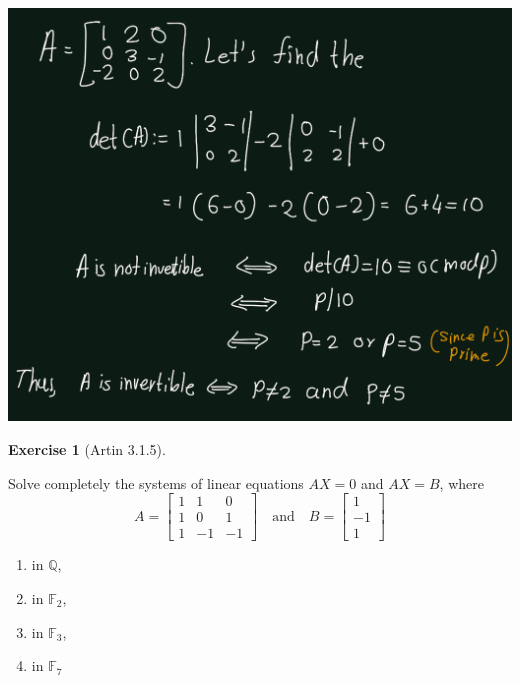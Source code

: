 \documentclass[
]{book}
\providecommand{\tightlist}{%
  \setlength{\itemsep}{0pt}\setlength{\parskip}{0pt}}
\theoremstyle{definition}
\theoremstyle{definition}
\theoremstyle{definition}
\newtheorem{exercise}{Exercise}[chapter]
\theoremstyle{definition}
\theoremstyle{remark}
\begin{document}
\includegraphics{figures/ch_3/ex-1.5.png}

\begin{exercise}[Artin 3.1.5]
\protect\hypertarget{exr:unnamed-chunk-263}{}\label{exr:unnamed-chunk-263}

Solve completely the systems of linear equations \(AX = 0\) and \(AX = B\), where
\[
A = \begin{bmatrix} 1 & 1 & 0 \\ 1 & 0 & 1 \\ 1 & -1 & -1 \end{bmatrix} \quad \text{and} \quad B = \begin{bmatrix} 1 \\ -1 \\ 1 \end{bmatrix}
\]

\begin{enumerate}
\def\labelenumi{(\alph{enumi})}
\tightlist
\item
  in \(\mathbb{Q}\),
\item
  in \(\mathbb{F}_2\),
\item
  in \(\mathbb{F}_3\),
\item
  in \(\mathbb{F}_7\)
\end{enumerate}

\end{exercise}
\end{document}
